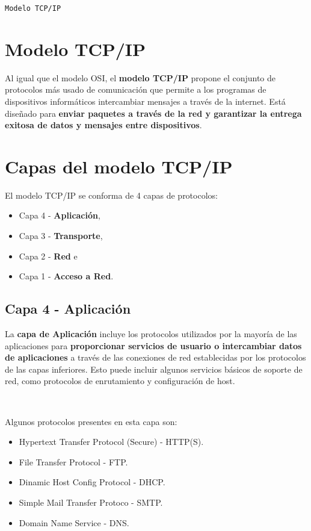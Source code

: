 \documentclass[a4paper,10pt]{article}
\begin{document}
\begin{center}
    {\Large \texttt{Modelo TCP/IP}}\\
\end{center}

\tableofcontents
\newpage



\section{Modelo TCP/IP}
Al igual que el modelo OSI, el \textbf{modelo TCP/IP} propone el conjunto de protocolos más usado de comunicación que permite a los programas de dispositivos informáticos intercambiar
mensajes a través de la internet. Está diseñado para \textbf{enviar paquetes a través de la red y garantizar la entrega exitosa de datos y mensajes entre dispositivos}.


\section{Capas del modelo TCP/IP}
El modelo TCP/IP se conforma de 4 capas de protocolos:

\begin{itemize}
    \item Capa 4 - \textbf{Aplicación},
    \item Capa 3 - \textbf{Transporte},
    \item Capa 2 - \textbf{Red} e
    \item Capa 1 - \textbf{Acceso a Red}.
\end{itemize}


\subsection{Capa 4 - Aplicación}
La \textbf{capa de Aplicación} incluye los protocolos utilizados por la mayoría de las aplicaciones para \textbf{proporcionar servicios de usuario o intercambiar datos de aplicaciones} 
a través de las conexiones de red establecidas por los protocolos de las capas inferiores. Esto puede incluir algunos servicios básicos de soporte de red, como protocolos de enrutamiento y configuración de host. 

\

Algunos protocolos presentes en esta capa son:

\begin{itemize}
    \item Hypertext Transfer Protocol (Secure) - HTTP(S).
    \item File Transfer Protocol - FTP.
    \item Dinamic Host Config Protocol - DHCP.
    \item Simple Mail Transfer Protoco - SMTP.
    \item Domain Name Service - DNS.
\end{itemize}
\end{document}
